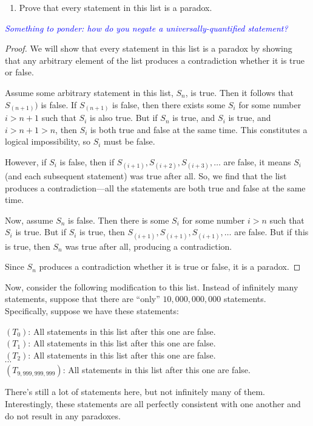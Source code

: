 \documentclass{article}
\renewcommand{\(}{\left(}
\renewcommand{\)}{\right)}
\theoremstyle{plain}
\theoremstyle{plain}
\theoremstyle{definition}
\begin{document}
\begin{enumerate}[resume*]

\item Prove that every statement in this list is a paradox. 

\end{enumerate}

\textit{\textcolor{blue}{Something to ponder: how do you negate a universally-quantified statement?}} \\

\begin{shaded}
\begin{proof} We will show that every statement in this list is a paradox by showing that any arbitrary element of the list produces a contradiction whether it is true or false.
	
	Assume some arbitrary statement in this list, $S_n$, is true. Then it follows that $S_{(n+1)})$ is false. If $S_{(n+1)}$ is false, then there exists some $S_i$ for some number $i > n + 1$ such that $S_i$ is also true. But if $S_n$ is true, and $S_i$ is true, and $i > n + 1 > n$, then $S_i$ is both true and false at the same time. This constitutes a logical impossibility, so $S_i$ must be false.
	
	However, if $S_i$ is false, then if $S_{(i+1)}, S_{(i+2)}, S_{(i+3)}, \ldots$ are false, it means $S_i$ (and each subsequent statement) was true after all. So, we find that the list produces a contradiction---all the statements are both true and false at the same time.
	
	Now, assume $S_n$ is false. Then there is some $S_i$ for some number $i > n$ such that $S_i$ is true. But if $S_i$ is true, then $S_{(i+1)}, S_{(i+1)}, S_{(i+1)}, \ldots$ are false. But if this is true, then $S_n$ was true after all, producing a contradiction.
	
	Since $S_n$ produces a contradiction whether it is true or false, it is a paradox.
\end{proof}
\end{shaded}

Now, consider the following modification to this list.
Instead of infinitely many statements,
suppose that there are ``only'' $10,000,000,000$ statements.
Specifically, suppose we have these statements:
\begin{mdframed}[backgroundcolor=yellow!20] 
\begin{center}
$(T_0)$: All statements in this list after this one are false. \\
$(T_1)$: All statements in this list after this one are false. \\
$(T_2)$: All statements in this list after this one are false. \\
$\cdots$ \\
$(T_{9,999,999,999})$: All statements in this list after this one are false.
\end{center}
\end{mdframed}
There's still a lot of statements here,
but not infinitely many of them.
Interestingly,
these statements are all perfectly consistent with one another and do not
result in any paradoxes.
\end{document}
